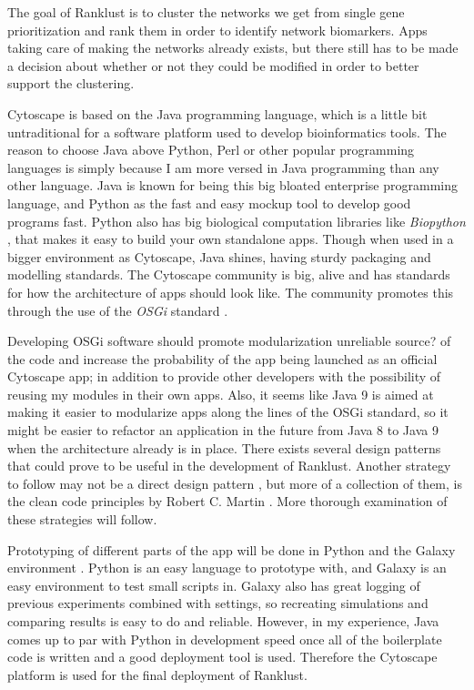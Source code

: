 The goal of Ranklust is to cluster the networks we get from single gene prioritization and rank them in order to 
identify network biomarkers. Apps taking care of making the networks already exists, but there still has to be made a 
decision about whether or not they could be modified in order to better support the clustering.

Cytoscape is based on the Java programming language, which is a little bit
untraditional for a software platform used to develop bioinformatics tools. 
The reason to choose Java above Python, Perl or other popular programming
languages is simply because I am more versed in Java programming than any other
language. Java is known for being this big bloated enterprise programming
language, and Python as the fast and easy mockup tool to develop good programs
fast. Python also has big biological computation libraries like \emph{Biopython}
\cite{biopython}, that makes it easy to build your own standalone apps. Though
when used in a bigger environment as Cytoscape, Java shines, having sturdy
packaging and modelling standards. The Cytoscape community is big, alive and has
standards for how the architecture of apps should look like. The community
promotes this through the use of the \emph{OSGi} standard \cite{cytoscape-osgi}.

Developing OSGi software should promote modularization \cite{modularization} %
unreliable source?  of the code and increase the probability of the app being
launched as an official Cytoscape app; in addition to provide other developers
with the possibility of reusing my modules in their own apps. Also, it seems
like Java 9 is aimed at making it easier to modularize apps along the lines of
the OSGi standard, so it might be easier to refactor an application in the
future from Java 8 to Java 9 when the architecture already is in place. There
exists several design patterns that could prove to be useful in the development
of Ranklust. Another strategy to follow may not be a direct design pattern
\cite{designpattern}, but more of a collection of them, is the clean code
principles by Robert C. Martin \cite{cleancode}. More thorough examination of
these strategies will follow.

Prototyping of different parts of the app will be done in Python and the Galaxy
environment \cite{galaxy}. Python is an easy language to prototype with, and
Galaxy is an easy environment to test small scripts in. Galaxy also has great
logging of previous experiments combined with settings, so recreating
simulations and comparing results is easy to do and reliable. However, in my
experience, Java comes up to par with Python in development speed once all of
the boilerplate code is written and a good deployment tool is used. Therefore
the Cytoscape platform is used for the final deployment of Ranklust.

